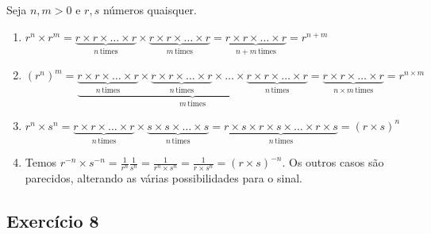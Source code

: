 Seja $n, m > 0$ e $r, s$ números quaisquer.

\begin{enumerate}
\item
$r^n \times r^m =
\underset{n\,\text{times}}{\underbrace{r \times r \times \ldots \times r}} \times
\underset{m\,\text{times}}{\underbrace{r \times r \times \ldots \times r}} =
\underset{n+m\,\text{times}}{\underbrace{r \times r \times \ldots \times r}}
= r^{n+m}$

\item
$\left(r^{n}\right)^m =
\underset{m\,\text{times}}{
\underbrace{{\underset{n\,\text{times}}{\underbrace{r \times r \times \ldots \times r}} \times
\underset{n\,\text{times}}{\underbrace{r \times r \times \ldots \times r}} \times
\ldots \times
\underset{n\,\text{times}}{\underbrace{r \times r \times \ldots \times r}}}}} =
\underset{n \times m\,\text{times}}{\underbrace{r \times r \times \ldots \times r}} =
r^{n \times m}
$

\item $r^n \times s^n =
\underset{n\,\text{times}}{\underbrace{r \times r \times \ldots \times r}} \times
\underset{n\,\text{times}}{\underbrace{s \times s \times \ldots \times s}} =
\underset{n\,\text{times}}{\underbrace{{r \times s} \times {r \times  s} \times \ldots \times {r \times s}}}
= {\left(r \times s\right)}^{n}$

\item Temos
$r^{-n} \times s^{-n} = \frac{1}{r^n} \frac{1}{s^n} =
\frac{1}{r^n \times s^n} = \frac{1}{{r \times s}^{n}} =
{\left(r \times s\right)}^{-n}$. Os outros casos são parecidos, alterando as
várias possibilidades para o sinal.

\end{enumerate}

\subsection*{Exercício 8}

